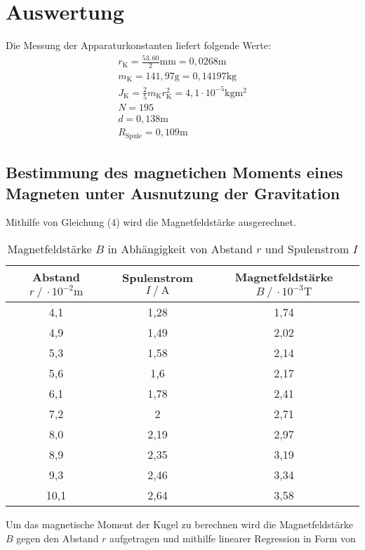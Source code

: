 \section{Auswertung}
\label{sec:Auswertung}

Die Messung der Apparaturkonstanten liefert folgende Werte:
\begin{gather*}
  r_\text{K} = \frac{53,60}{2} \si{\milli\meter} = 0,0268 \si{\meter} \\
  m_\text{K} = 141,97 \si{\gram} = 0,14197 \si{\kilo\gram} \\
  J_\text{K} = \frac{2}{5} m_\text{K} r_\text{K}^2 = 4,1 \cdot 10^{-5} \si{\kilo\gram\meter\squared} \\
  N = 195 \\
  d = 0,138 \si{\meter} \\
  R_\text{Spule} = 0,109 \si{\meter}
\end{gather*}

\subsection{Bestimmung des magnetichen Moments eines Magneten unter Ausnutzung der Gravitation}
Mithilfe von Gleichung (4) wird die Magnetfeldstärke ausgerechnet.
\begin{table}
\centering
\caption{Magnetfeldstärke $B$ in Abhängigkeit von Abstand $r$ und Spulenstrom $I$}
\label{tab:bfeld}
\begin{tabular}{c c c}
\toprule
Abstand $r\:/\:\cdot 10^{-2}\si{\meter}$ & Spulenstrom $I\:/\:\si{\ampere}$ & Magnetfeldstärke $B\:/\:\cdot 10^{-3}\si{\tesla}$ \\
\midrule
4,1 & 1,28 & 1,74 \\
4,9 & 1,49 & 2,02 \\
5,3 & 1,58 & 2,14 \\
5,6 & 1,6 & 2,17 \\
6,1 & 1,78 & 2,41 \\
7,2 & 2 & 2,71 \\
8,0 & 2,19 & 2,97 \\
8,9 & 2,35 & 3,19 \\
9,3 & 2,46 & 3,34 \\
10,1 & 2,64 & 3,58 \\
\bottomrule
\end{tabular}
\end{table}

Um das magnetische Moment der Kugel zu berechnen wird die Magnetfeldstärke $B$ gegen den Abstand 
$r$ aufgetragen und mithilfe linearer Regression in Form von 

